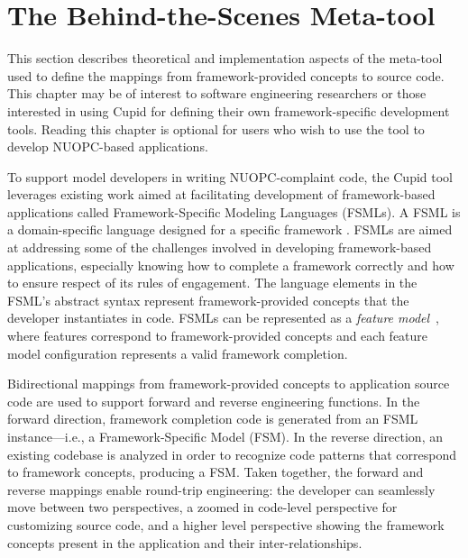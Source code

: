 \documentclass[oneside,11pt]{memoir}
\begin{document}
\chapter{The Behind-the-Scenes Meta-tool}

This section describes theoretical and implementation aspects of the meta-tool used to define the mappings from framework-provided concepts to source code. This chapter may be of interest to software engineering researchers or those interested in using Cupid for defining their own framework-specific development tools. Reading this chapter is optional for users who wish to use the tool to develop NUOPC-based applications.

To support model developers in writing NUOPC-complaint code, the Cupid tool leverages existing work aimed at facilitating development of framework-based applications called Framework-Specific Modeling Languages (FSMLs). A FSML is a domain-specific language designed for a specific framework \cite{antkiewicz06}. FSMLs are aimed at addressing some of the challenges involved in developing framework-based applications, especially knowing how to complete a framework correctly and how to ensure respect of its rules of engagement\cite{antkiewicz06}. The language elements in the FSML's abstract syntax represent framework-provided concepts that the developer instantiates in code. FSMLs can be represented as a \emph{feature model}~\cite{czarnecki}, where features correspond to framework-provided concepts and each feature model configuration represents a valid framework completion.

Bidirectional mappings from framework-provided concepts to application source code are used to support forward and reverse engineering functions. In the forward direction, framework completion code is generated from an FSML instance---i.e., a Framework-Specific Model (FSM). In the reverse direction, an existing codebase is analyzed in order to recognize code patterns that correspond to framework concepts, producing a FSM. Taken together, the forward and reverse mappings enable round-trip engineering: the developer can seamlessly move between two perspectives, a zoomed in code-level perspective for customizing source code, and a higher level perspective showing the framework concepts present in the application and their inter-relationships. 
\end{document}
